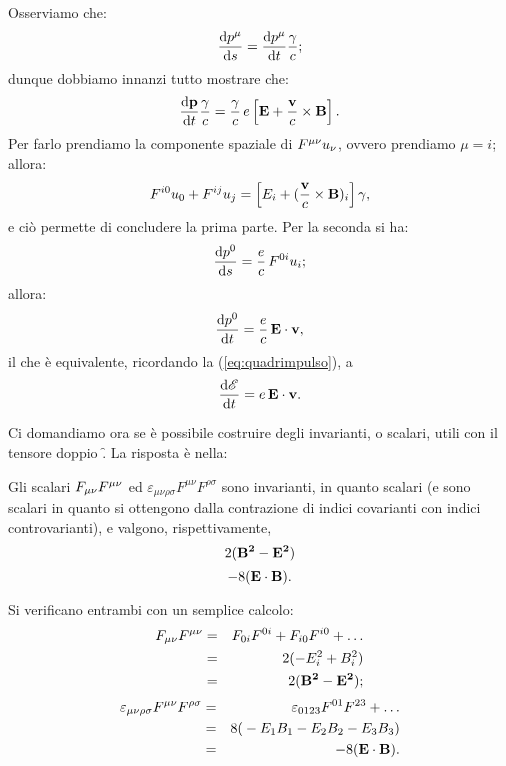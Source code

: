 \begin{dimostrazione}
  Osserviamo che:
$$
\frac{\mathrm{d} p^{\mu}}{\mathrm{d} s} = \frac{\mathrm{d} p^{\mu}}{\mathrm{d} t}\frac{\gamma}{c};
$$
dunque dobbiamo innanzi tutto mostrare che:
$$
\frac{\mathrm{d} \mathbf{p}}{\mathrm{d} t}\frac{\gamma}{c} = \frac{\gamma}{c} \, e
\left[ \mathbf{E} + \frac{\mathbf{v}}{c} \times \mathbf{B}\right].
$$
Per farlo prendiamo la componente spaziale di $F^{\mu\nu} u_{\nu}$, ovvero
prendiamo $\mu = i$; allora:
$$
F^{i0}u_0 + F^{ij}u_j = \left[ E_i + (\frac{\mathbf{v}}{c} \times
  \mathbf{B})_i \right] \gamma,
$$
e ci\`o permette di concludere la prima parte. Per la seconda si ha:
$$
\frac{\mathrm{d} p^{0}}{\mathrm{d} s} = \frac{e}{c}\, F^{0i}u_i;
$$
allora:
$$
\frac{\mathrm{d} p^{0}}{\mathrm{d} t} = \frac{e}{c}\, \mathbf{E \cdot v},
$$
il che \`e equivalente, ricordando la (\ref{eq:quadrimpulso}), a
$$
\frac{\mathrm{d} \mathscr{E}}{\mathrm{d} t} = e \,\mathbf{E \cdot v}.
$$
\end{dimostrazione}
Ci domandiamo ora se \`e possibile costruire degli invarianti, o
scalari, utili con il tensore doppio \f. La risposta \`e nella:
\begin{proposizione}
  Gli scalari $F_{\mu\nu}F^{\mu\nu}$ ed
  $\varepsilon_{\mu\nu\rho\sigma}F^{\mu\nu}F^{\rho\sigma}$ sono
  invarianti, in quanto scalari (e sono scalari in quanto si ottengono
  dalla contrazione di indici covarianti con indici controvarianti), e
  valgono, rispettivamente,
$$
2(\mathbf{B^2-E^2})
$$
$$
-8 (\mathbf{E\cdot B}).
$$
\end{proposizione}
\begin{dimostrazione}
  Si verificano entrambi con un semplice calcolo:
  \begin{eqnarray*}
    F_{\mu\nu}F^{\mu\nu} & = & F_{0i}F^{0i} + F_{i0}F^{i0} + \ldots \\
    & = & 2 (-E_i^2 + B_i^2)\\ & = & 2 (\mathbf{B^2-E^2});
  \end{eqnarray*}
  \begin{eqnarray*}
    \varepsilon_{\mu\nu\rho\sigma}F^{\mu\nu}F^{\rho\sigma} & = &
    \varepsilon_{0123}F^{01}F^{23} + \ldots \\
    & = & 8 (\mbox{}-E_1 B_1 - E_2 B_2 -E_3 B_3)\\
    & = & -8 (\mathbf{E\cdot B}).
  \end{eqnarray*}
\end{dimostrazione}

